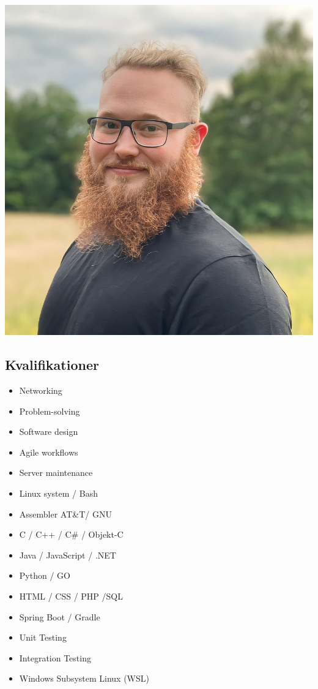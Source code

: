 \documentclass{article}
\begin{document}
	\begin{minipage}[t]{0.28\textwidth}
		\begin{minipage}[t]{0.8\textwidth}
			\vspace{-140pt} %
			\includegraphics[width=\linewidth]{../../me-s.png}
			\label{fig:bild}
		\end{minipage}
		\vspace{-10pt} %
		\subsection*{\textcolor{colorBlue}{Kvalifikationer}}
		\begin{itemize}
			\item Networking
			\item Problem-solving
			\item Software design
			\item Agile workflows
			\item Server maintenance
			\item Linux system / Bash
			\item Assembler AT\&T/ GNU
			\item C / C++ / C\# / Objekt-C
			\item Java / JavaScript / .NET
			\item Python / GO
			\item HTML / CSS / PHP /SQL
			\item Spring Boot / Gradle
			\item Unit Testing
			\item Integration Testing
			\item Windows Subsystem Linux (WSL)
		\end{itemize}
		\vspace{-10pt} %

\end{minipage}
\end{document}
